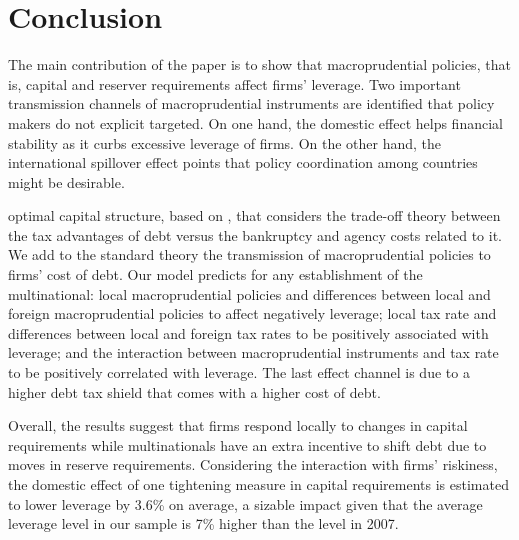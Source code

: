 \documentclass[12pt]{article}
\begin{document}


	\section{Conclusion} \label{sec:conclusion}
		
	The main contribution of the paper is to show that macroprudential policies, that is, capital and reserver requirements affect firms' leverage. Two important transmission channels of macroprudential instruments are identified that policy makers do not explicit targeted. On one hand, the domestic effect helps financial stability as it curbs excessive leverage of firms. On the other hand, the international spillover effect points that policy coordination among countries might be desirable. 
	
	optimal capital structure, based on \cite*{huizinga2008capital}, that considers the trade-off theory between the tax advantages of debt versus the bankruptcy and agency costs related to it. We add to the standard theory the transmission of macroprudential policies to firms' cost of debt. Our model predicts for any establishment of the multinational: local macroprudential policies and differences between local and foreign macroprudential policies to affect negatively leverage; local tax rate and differences between local and foreign tax rates to be positively associated with leverage; and the interaction between macroprudential instruments and tax rate to be positively correlated with leverage. The last effect channel is due to a higher debt tax shield that comes with a higher cost of debt.
	
	Overall, the results suggest that firms respond locally to changes in capital requirements while multinationals have an extra incentive to shift debt due to moves in reserve requirements. Considering the interaction with firms' riskiness, the domestic effect of one tightening measure in capital requirements is estimated to lower leverage by 3.6\% on average, a sizable impact given that the average leverage level in our sample is 7\% higher than the level in 2007. 
	
\end{document}
